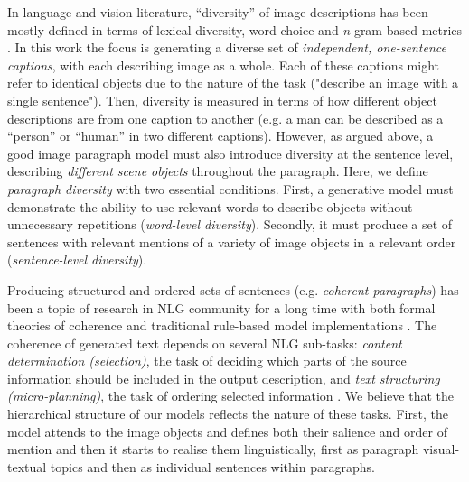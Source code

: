 \documentclass[11pt,a4paper]{article}
\newcommand{\kibitz}[2]{\ifnum\Comments=1\textcolor{#1}{#2}\fi}
\newcommand{\nikolai}[1]{\kibitz{red}   {[Nikolai: #1]}}
\begin{document}
In language and vision literature, ``diversity'' of image descriptions has been mostly defined in terms of lexical diversity, word choice and \textit{n}-gram based metrics \cite{Devlin2015, Vijayakumar2016, Lindh2018, VanMiltenburg2018}.
In this work the focus is generating a diverse set of \textit{independent, one-sentence captions}, with each describing image as a whole.
Each of these captions might refer to identical objects due to the nature of the task ("describe an image with a single sentence").
Then, diversity is measured in terms of how different object descriptions are from one caption to another (e.g. a man can be described as a ``person'' or ``human'' in two different captions).
However, as argued above, a good image paragraph model must also introduce diversity at the sentence level, describing \textit{different scene objects} throughout the paragraph. %
Here, we define \textit{paragraph diversity} with two essential conditions.
First, a generative model must demonstrate the ability to use %
relevant words to describe objects without unnecessary repetitions (\emph{word-level diversity}).
Secondly, it must produce a set of sentences with relevant mentions of a variety of image objects in a relevant order (\emph{sentence-level diversity}). 


Producing structured and ordered sets of sentences (e.g. \textit{coherent paragraphs}) has been a topic of research in NLG community for a long time with both formal theories of coherence \cite{grosz95,Barzilay2008} and traditional rule-based model implementations \cite{Reiter00buildingnatural,Deemter:2016aa}.
The coherence of generated text depends on several NLG sub-tasks: \textit{content determination (selection)}, the task of deciding which parts of the source information should be included in the output description, and \textit{text structuring (micro-planning)}, the task of ordering selected information \cite{Gatt2017}.
We believe that the hierarchical structure of our models reflects the nature of these tasks. First, the model attends to the image objects and defines both their salience and order of mention and then it starts to realise them linguistically, first as paragraph visual-textual topics and then as individual sentences within paragraphs.
\end{document}
